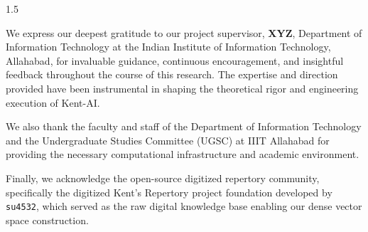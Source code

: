 
\begin{acknowledgements}
\begin{spacing}{1.5}
\addchaptertocentry{\acknowledgementname} %

We express our deepest gratitude to our project supervisor, \textbf{XYZ}, Department of Information Technology at the Indian Institute of Information Technology, Allahabad, for invaluable guidance, continuous encouragement, and insightful feedback throughout the course of this research. The expertise and direction provided have been instrumental in shaping the theoretical rigor and engineering execution of Kent-AI.

We also thank the faculty and staff of the Department of Information Technology and the Undergraduate Studies Committee (UGSC) at IIIT Allahabad for providing the necessary computational infrastructure and academic environment.

Finally, we acknowledge the open-source digitized repertory community, specifically the digitized Kent's Repertory project foundation developed by \texttt{su4532}, which served as the raw digital knowledge base enabling our dense vector space construction.

\end{spacing}
\end{acknowledgements}


\tableofcontents %

\listoffigures %


\listoftables %



